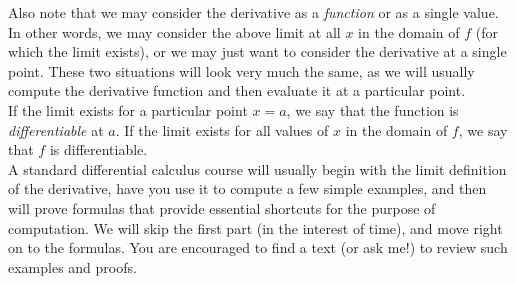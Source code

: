 \documentclass[12pt,a4paper]{article} %
\begin{document}
Also note that we may consider the derivative as a \emph{function} or as a single value. In other words, we may consider the above limit at all $x$ in the domain of $f$ (for which the limit exists), or we may just want to consider the derivative at a single point. These two situations will look very much the same, as we will usually compute the derivative function and then evaluate it at a particular point.\\
If the limit exists for a particular point $x=a$, we say that the function is \emph{differentiable} at $a$. If the limit exists for all values of $x$ in the domain of $f$, we say that $f$ is differentiable.\\

A standard differential calculus course will usually begin with the limit definition of the derivative, have you use it to compute a few simple examples, and then will prove formulas that provide essential shortcuts for the purpose of computation. We will skip the first part (in the interest of time), and move right on to the formulas. You are encouraged to find a text (or ask me!) to review such examples and proofs. 
\end{document}
